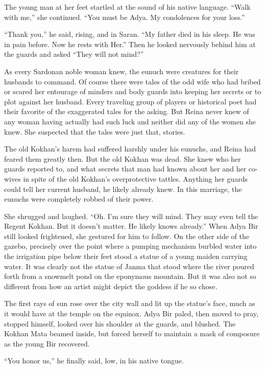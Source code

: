 \documentclass{article}
\begin{document}
	The young man at her feet startled at the sound of his native language. “Walk with me,” she continued. “You must be Adya. My condolences for your loss.” 
	
	“Thank you,” he said, rising, and in Saran. “My father died in his sleep. He was in pain before. Now he rests with Her.” Then he looked nervously behind him at the guards and asked “They will not mind?”
	
	As every Sardonan noble woman knew, the eunuch were creatures for their husbands to command. Of course there were tales of the odd wife who had bribed or scared her entourage of minders and body guards into keeping her secrets or to plot against her husband. Every traveling group of players or historical poet had their favorite of the exaggerated tales for the asking. But Reina never knew of any woman having actually had such luck and neither did any of the women she knew. She suspected that the tales were just that, stories. 
	
	The old Kokhan’s harem had suffered harshly under his eunuchs, and Reina had feared them greatly then. But the old Kokhan was dead. She knew who her guards reported to, and what secrets that man had known about her and her co-wives in spite of the old Kokhan’s overprotective tattles. Anything her guards could tell her current husband, he likely already knew. In this marriage, the eunuchs were completely robbed of their power.
	
	She shrugged and laughed. “Oh. I’m sure they will mind. They may even tell the Regent Kokhan. But it doesn’t matter. He likely knows already.” When Adya Bir still looked frightened, she gestured for him to follow. On the other side of the gazebo, precisely over the point where a pumping mechanism burbled water into the irrigation pipe below their feet stood a statue of a young maiden carrying water. It was clearly not the statue of Janma that stood where the river poured forth from a snowmelt pond on the eponymous mountain. But it was also not so different from how an artist might depict the goddess if he so chose. 
	
	The first rays of sun rose over the city wall and lit up the statue's face, much as it would have at the temple on the equinox. Adya Bir paled, then moved to pray, stopped himself, looked over his shoulder at the guards, and blushed. The Kokhan Mata beamed inside, but forced herself to maintain a mask of composure as the young Bir recovered. 
	
	“You honor us,” he finally said, low, in his native tongue.
	
\end{document}
